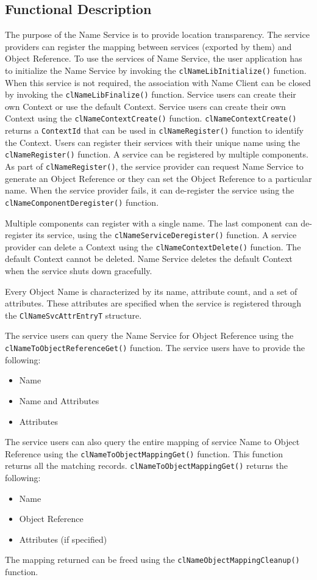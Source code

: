 \begin{flushleft}
\section{Functional Description}
The purpose of the Name Service is to provide location transparency. The service providers can register the mapping between services (exported by them) and 
Object Reference. To use the services of Name Service, the user application has to initialize the Name Service by invoking the {\tt{clNameLibInitialize()}}
function. When this 
service is not required, the association with Name Client can be closed by invoking the {\tt{clNameLibFinalize()}} function. Service users can create their own 
Context or use the default Context. Service users can create their own Context using the {\tt{clNameContextCreate()}} function. {\tt{clNameContextCreate()}} returns a 
{\tt{ContextId}} that can be used in {\tt{clNameRegister()}} function to identify the Context. Users can register their services with their unique name using the 
{\tt{clNameRegister()}} function. A service can be registered by multiple components. As part of {\tt{clNameRegister()}}, the service provider can request Name Service to 
generate an Object Reference or they can set the Object Reference to a particular name. When the service provider fails, it can de-register the service using the
{\tt{clNameComponentDeregister()}} function. 
\par
Multiple components can register with a single name. The last component can de-register its service, using the {\tt{clNameServiceDeregister()}} function.
A service provider can delete a Context using the {\tt{clNameContextDelete()}} function. The default Context cannot be deleted. Name Service deletes the default 
Context when the service shuts down gracefully.
\par
Every Object Name is characterized by its name, attribute count, and a set of attributes. These attributes are specified when the service is registered 
through the {\tt{ClNameSvcAttrEntryT}} structure.  
\par
The service users can query the Name Service for Object Reference using the {\tt{clNameToObjectReferenceGet()}} function.  The service users have to 
provide the following:
\begin{itemize}
\item
Name
\item
Name and Attributes
\item
Attributes 
\end{itemize}
The service users can also query the entire mapping of service Name to Object Reference using the {\tt{clNameToObjectMappingGet()}} function. This function returns all 
the matching records. {\tt{clNameToObjectMappingGet()}} returns the following:
\begin{itemize}
\item
Name
\item
Object Reference
\item
Attributes (if specified)
\end{itemize}
The mapping returned can be freed using the {\tt{clNameObjectMappingCleanup()}} function. 






\end{flushleft}
